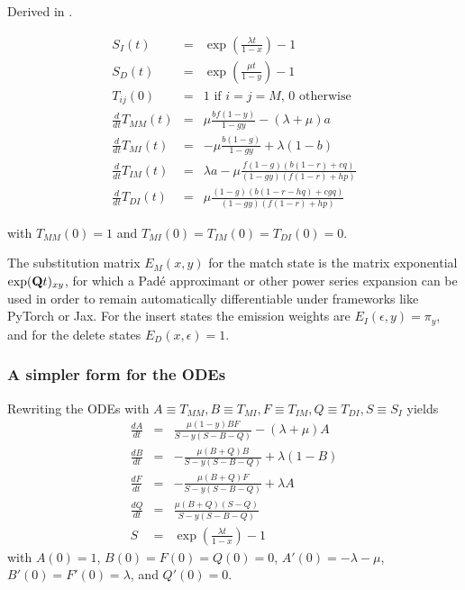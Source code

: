 \documentclass{article}
\begin{document}
Derived in \cite{Holmes2020}.

\begin{eqnarray*}
S_I(t) & = & \exp\left(\frac{\lambda t}{1-x}\right)-1 \\
S_D(t) & = & \exp\left(\frac{\mu t}{1-y}\right)-1 \\
 T_{ij}(0) & = & \mbox{1 if $i=j=M$, 0 otherwise}
\\
  \frac{d}{dt} T_{MM}(t) & = &
  \mu \frac{b f (1-y)}{1 - g y}-(\lambda +\mu )a
  \nonumber \\
  \frac{d}{dt} T_{MI}(t) & = &
  -\mu \frac{b (1-g)}{1 - g y} + \lambda (1-b)
  \nonumber \\
  \frac{d}{dt} T_{IM}(t) & = &
  \lambda a - \mu \frac{f (1-g) (b (1-r)+c q)}{(1 - g y) (f (1-r)+h p)}
  \nonumber \\
  \frac{d}{dt} T_{DI}(t) & = &
  \mu \frac{(1-g) (b (1-r-h q)+c g q)}{(1-g y) (f (1-r)+h p)}
\end{eqnarray*}

with $T_{MM}(0)=1$ and $T_{MI}(0)=T_{IM}(0)=T_{DI}(0)=0$.

The substitution matrix $E_M(x,y)$ for the match state is
the matrix exponential $\exp({\bf Q}t)_{xy}$, for which a Pad\'{e} approximant
or other power series expansion can be used in order to remain automatically differentiable under frameworks like PyTorch or Jax. %
For the insert states the emission weights are $E_I(\epsilon,y)=\pi_y$,
and for the delete states $E_D(x,\epsilon)=1$.

\subsubsection{A simpler form for the ODEs}

Rewriting the ODEs with $A \equiv T_{MM}, B \equiv T_{MI}, F \equiv T_{IM}, Q \equiv T_{DI}, S \equiv S_I$
yields
\begin{eqnarray*}
  \frac{dA}{dt} & = & \frac{\mu (1-y) B F}{S - y(S-B-Q)} - (\lambda +\mu ) A \\
  \frac{dB}{dt} & = & -\frac{\mu (B+Q) B}{S - y(S-B-Q)} + \lambda (1-B) \\
  \frac{dF}{dt} & = & -\frac{\mu (B+Q) F}{S - y(S-B-Q)} + \lambda A \\
  \frac{dQ}{dt} & = & \frac{\mu (B+Q) (S-Q)}{S - y(S-B-Q)} \\
  S & = & \exp\left(\frac{\lambda t}{1-x}\right)-1
\end{eqnarray*}
with $A(0)=1$, $B(0)=F(0)=Q(0)=0$,
$A'(0)=-\lambda-\mu$, $B'(0)=F'(0)=\lambda$, and $Q'(0)=0$.
\end{document}
